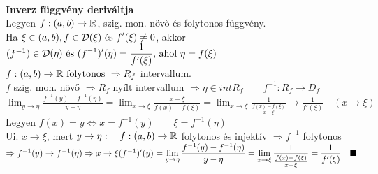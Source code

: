 \documentclass[a4paper,11pt]{article}
\begin{document}
\\[0.6cm]\textbf{{\Large Inverz függvény deriváltja}}\\[0.2cm]\tetel Legyen $f:(a,b)\to\mathbb{R}$, szig. mon. növő és folytonos függvény.\\[0.1cm]Ha $\xi\in(a,b),f\in\displaystyle\mathcal{D}(\xi) \text{ és }f'(\xi)\neq0$, akkor\\[0.1cm] $(f^{-1})\in\displaystyle\mathcal{D}(\eta)\text{ és }(f^{-1})'(\eta)=\frac{1}{f'(\xi)}\text{, ahol }\eta=f(\xi)$\\[0.2cm]\biz $f:(a,b)\to\mathbb{R}\text{ folytonos }\Rightarrow R_f$ intervallum.\\[0.2cm] $f$ szig. mon. növő $\Rightarrow R_f$ nyílt intervallum $\Rightarrow\eta\in int R_f\quad\quad f^{-1}:R_f\to D_f$\\[0.2cm] $\displaystyle\lim_{y\to\eta}\frac{f^{-1}(y)-f^{-1}(\eta)}{y-\eta}=\displaystyle\lim_{x\to\xi}\frac{x-\xi}{f(x)-f(\xi)}=\displaystyle\lim_{x\to\xi}\frac{1}{\frac{f(x)-f(\xi)}{x-\xi}}\longrightarrow\frac{1}{f'(\xi)}\quad(x\to\xi)$\\[0.2cm] Legyen $f(x)=y\Leftrightarrow x=f^{-1}(y)\quad\quad\xi=f^{-1}(\eta)$\\[0.2cm] Ui. $x\to\xi$, mert $y\to\eta:\quad f:(a,b)\to\mathbb{R}$ folytonos és injektív $\Rightarrow f^{-1}$ folytonos $\Rightarrow f^{-1}(y)\to f^{-1}(\eta)\\[0.1cm]\Rightarrow x\to\xi\\[0.2cm](f^{-1})'(y)=\displaystyle\lim_{y\to\eta}\frac{f^{-1}(y)-f^{-1}(\eta)}{y-\eta}=\displaystyle\lim_{x\to\xi}\frac{1}{\frac{f(x)-f(\xi)}{x-\xi}}= \frac{1}{f'(\xi)}\quad\blacksquare$
\end{document}
